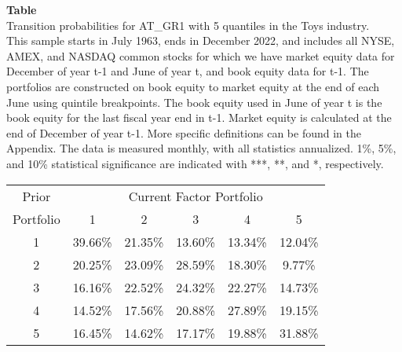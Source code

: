 \begin{table*}[ht!]
\raggedright
{}
\label{tab: transition_probs_AT_GR1_Toys_with_5_quantiles}
\textbf{Table \thetable} \\
Transition probabilities for AT_GR1 with 5 quantiles in the Toys industry. \\
\hspace*{1em}This sample starts in July 1963, ends in December 2022, and includes all NYSE, AMEX, and NASDAQ common stocks for which we have market equity data for December of year t-1 and June of year t, and book equity data for t-1. The portfolios are constructed on book equity to market equity at the end of each June using quintile breakpoints.  The book equity used in June of year t is the book equity for the last fiscal year end in t-1.  Market equity is calculated at the end of December of year t-1.  More specific definitions can be found in the Appendix.  The data is measured monthly, with all statistics annualized.  1\%, 5\%, and 10\% statistical significance are indicated with ***, **, and *, respectively. \\
\vspace{0.5em}
\centering
\begin{adjustbox}{max width=\textwidth}
\begin{tabular}{@{}cccccc@{}}
\toprule
Prior & \multicolumn{5}{c}{Current Factor Portfolio} \\
Portfolio & 1 & 2 & 3 & 4 & 5 \\
\midrule
1 & 39.66\% & 21.35\% & 13.60\% & 13.34\% & 12.04\% \\
2 & 20.25\% & 23.09\% & 28.59\% & 18.30\% & 9.77\% \\
3 & 16.16\% & 22.52\% & 24.32\% & 22.27\% & 14.73\% \\
4 & 14.52\% & 17.56\% & 20.88\% & 27.89\% & 19.15\% \\
5 & 16.45\% & 14.62\% & 17.17\% & 19.88\% & 31.88\% \\
\bottomrule
\end{tabular}
\end{adjustbox}
\end{table*}